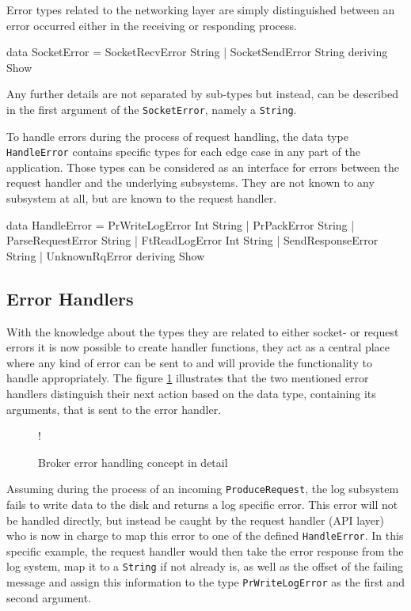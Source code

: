 Error types related to the networking layer are simply distinguished between an
error occurred either in the receiving or responding process.

\begin{code}
data SocketError =
      SocketRecvError String
      | SocketSendError String
      deriving Show
\end{code}

Any further details are not separated by sub-types but instead, can be described
in the first argument of the \lstinline{SocketError}, namely a
\lstinline{String}.

To handle errors during the process of request handling, the data type
\lstinline{HandleError} contains specific types for each edge case in any part
of the application. Those types can be considered as an interface for errors
between the request handler and the underlying subsystems. They are not known to
any subsystem at all, but are known to the request handler.

\begin{code}
data HandleError =
        PrWriteLogError Int String
      | PrPackError String
      | ParseRequestError String
      | FtReadLogError Int String
      | SendResponseError String
      | UnknownRqError
        deriving Show
\end{code}


\subsection{Error Handlers}

With the knowledge about the types they are related to either socket- or request
errors it is now possible to create handler functions, they act as a central
place where any kind of error can be sent to and will provide the
functionality to handle appropriately. The figure
\ref{fig:broker-error-activity-detail} illustrates that the two
mentioned error handlers distinguish their next action based on the data type,
containing its arguments, that is sent to the error handler.

\begin{figure}[H]
  \centering
   {!} {
    
  }
  \caption{Broker error handling concept in detail}
  \label{fig:broker-error-activity-detail}
\end{figure}

Assuming during the process of an incoming \lstinline{ProduceRequest}, the log
subsystem fails to write data to the disk and returns a log specific error. This
error will not be handled directly, but instead be caught by the request handler
(API layer) who is now in charge to map this error to one of the defined
\lstinline{HandleError}. In this specific example, the request handler would
then take the error response from the log system, map it to a \lstinline{String}
if not already is, as well as the offset of the failing message and assign this
information to the type \lstinline{PrWriteLogError} as the first and second
argument. \\

